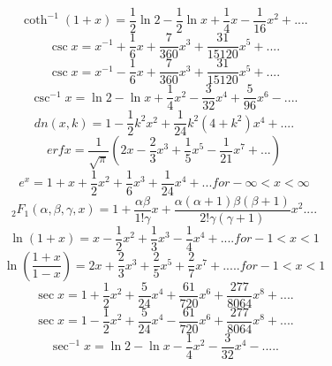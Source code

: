 \begin{equation}
\coth^{-1}(1+x) = \frac{1}{2} \ln 2 - \frac{1}{2} \ln x + \frac{1}{4} x - \frac{1}{16} x^2 + ....
\end{equation}
\begin{equation}
\csc x = x^{-1} + \frac{1}{6} x + \frac{7}{360} x^3 + \frac{31}{15120} x^5 + ....
\end{equation}
\begin{equation}
\csc x = x^{-1} - \frac{1}{6} x + \frac{7}{360} x^3 + \frac{31}{15120} x^5 + ....
\end{equation}
\begin{equation}
\csc^{-1} x = \ln 2 - \ln x + \frac{1}{4} x^2 - \frac{3}{32} x^4 + \frac{5}{96} x^6 - ....
\end{equation}
\begin{equation}
dn(x,k) = 1 - \frac{1}{2} k^2 x^2 + \frac{1}{24} k^2 (4+k^2) x^4 + ....
\end{equation}
\begin{equation}
erf x = \frac{1}{\sqrt{\pi}} (2x - \frac{2}{3} x^3 + \frac{1}{5} x^5 - \frac{1}{21}x^7 + ...) 
\end{equation}
\begin{equation}
e^x = 1 + x + \frac{1}{2} x^2 + \frac{1}{6} x^3 + \frac{1}{24} x^4 + ... for - \infty < x < \infty 
\end{equation}
\begin{equation}
_{2}F_{1} (\alpha,\beta,\gamma,x) = 1 + \frac{\alpha\beta}{1!\gamma} x + \frac{\alpha(\alpha + 1)\beta(\beta + 1)}{2!\gamma(\gamma + 1)} x^2 ....
\end{equation}
\begin{equation}
\ln(1 + x) = x - \frac{1}{2} x^2 + \frac{1}{3} x^3 - \frac{1}{4} x^4 + ....for -1 < x < 1 
\end{equation}
\begin{equation}
\ln (\frac{1+x}{1-x}) = 2x + \frac{2}{3} x^3 + \frac{2}{5} x^5 + \frac{2}{7} x^7 + ..... for -1 < x < 1 
\end{equation}
\begin{equation}
\sec x = 1 + \frac{1}{2} x^2 + \frac{5}{24} x^4 + \frac{61}{720} x^6 + \frac{277}{8064} x^8 + ....
\end{equation}
\begin{equation}
\sec x = 1 - \frac{1}{2} x^2 + \frac{5}{24} x^4 - \frac{61}{720} x^6 + \frac{277}{8064} x^8 + ....
\end{equation}
\begin{equation}
\sec^{-1} x = \ln 2 - \ln x - \frac{1}{4} x^2 - \frac{3}{32} x^4 - .....
\end{equation}
